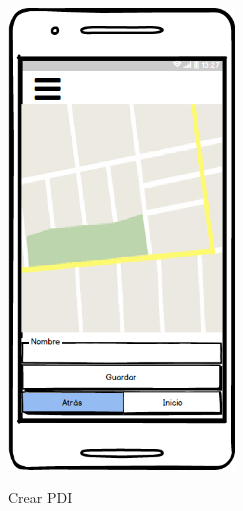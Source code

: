 \begin{figure}[htbp]
\begin{minipage}[b]{0.5\linewidth}
\end{minipage}
\end{figure}
	















	\begin{figure}[htbp]
\begin{minipage}[b]{0.5\linewidth} %
\centering
\includegraphics[width=6cm]{maqueta/pdi1.png}
 \label{figura1}
\caption{Crear PDI}


\end{minipage}
\end{figure}
